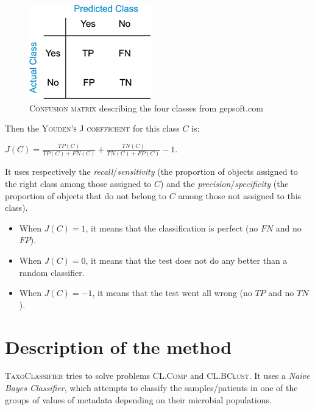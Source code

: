 \documentclass{report}
\begin{document}
\begin{figure}[H]
\centering
\includegraphics[scale=0.5]{illustrations/confusionmatrix.png}
\caption{\textsc{Confusion matrix} describing the four classes from gepsoft.com}
\end{figure}

Then the \textsc{Youden's J coefficient} for this class $C$ is:\\

\begin{center}
$J(C) = \frac{TP(C)}{TP(C) + FN(C)} + \frac{TN(C)}{TN(C) + FP(C)} - 1$.\\
\end{center}

It uses respectively the \emph{recall}/\emph{sensitivity}\cite{F-measure} (the proportion of objects assigned to the right class among those assigned to $C$) and the \emph{precision}/\emph{specificity}\cite{F-measure} (the proportion of objects that do not belong to $C$ among those not assigned to this class).\\

\begin{itemize}
\item When $J(C) = 1$, it means that the classification is perfect (no $FN$ and no $FP$).
\item When $J(C) = 0$, it means that the test does not do any better than a random classifier.
\item When $J(C) = -1$, it means that the test went all wrong (no $TP$ and no $TN$).
\end{itemize}

\section{Description of the method}

\textsc{TaxoClassifier} tries to solve problems \textsc{CL.Comp} and \textsc{CL.BClust}. It uses a \emph{Naive Bayes Classifier}, which attempts to classify the samples/patients in one of the groups of values of metadata depending on their microbial populations.\\
\end{document}
